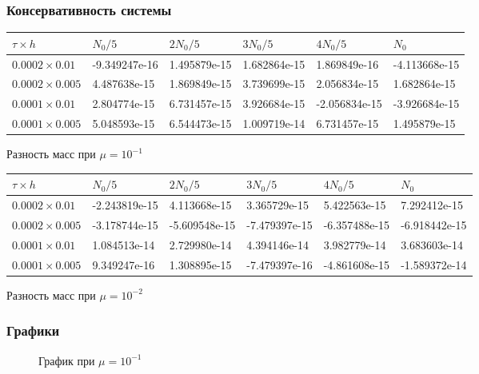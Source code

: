\documentclass[12pt]{article}
\begin{document}
\subsubsection{Консервативность системы}
\begin{center}
  \begin{tabular}{| l | l | l | l | l | l |}     \hline
      $\tau \times h$ & $N_{0} / 5$ & $2N_{0} / 5$ & $3N_{0} / 5$ & $4N_{0}/5$ & $N_{0}$  \\ \hline
$0.0002 \times 0.01$ & -9.349247e-16 & 1.495879e-15 & 1.682864e-15 & 1.869849e-16 & -4.113668e-15  \\ \hline
$0.0002 \times 0.005$ & 4.487638e-15 & 1.869849e-15 & 3.739699e-15 & 2.056834e-15 & 1.682864e-15  \\ \hline
$0.0001 \times 0.01$ & 2.804774e-15 & 6.731457e-15 & 3.926684e-15 & -2.056834e-15 & -3.926684e-15  \\ \hline
$0.0001 \times 0.005$ & 5.048593e-15 & 6.544473e-15 & 1.009719e-14 & 6.731457e-15 & 1.495879e-15  \\ \hline
  \end{tabular}
  $ \text {Разность масс  при } \mu=10^{-1}$
\end{center}
\vfill

\begin{center}
  \begin{tabular}{| l | l | l | l | l | l |}     \hline
      $\tau \times h$ & $N_{0} / 5$ & $2N_{0} / 5$ & $3N_{0} / 5$ & $4N_{0}/5$ & $N_{0}$  \\ \hline
$0.0002 \times 0.01$ & -2.243819e-15 & 4.113668e-15 & 3.365729e-15 & 5.422563e-15 & 7.292412e-15  \\ \hline
$0.0002 \times 0.005$ & -3.178744e-15 & -5.609548e-15 & -7.479397e-15 & -6.357488e-15 & -6.918442e-15  \\ \hline
$0.0001 \times 0.01$ & 1.084513e-14 & 2.729980e-14 & 4.394146e-14 & 3.982779e-14 & 3.683603e-14  \\ \hline
$0.0001 \times 0.005$ & 9.349247e-16 & 1.308895e-15 & -7.479397e-16 & -4.861608e-15 & -1.589372e-14  \\ \hline

  \end{tabular}
  $ \text {Разность масс при } \mu=10^{-2}$
\end{center}
\vfill

\subsubsection{Графики}
\begin{figure}[H]
\caption{График при $\mu=10^{-1}$}
\label{fig:image}
\end{figure}
\end{document}
